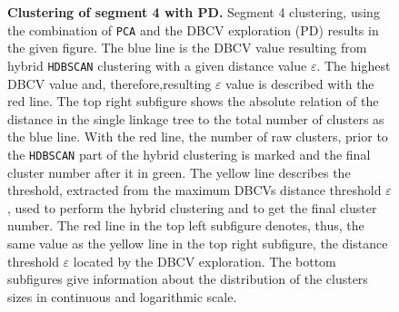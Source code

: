 \begin{figure}[!htb]
\begin{subfigure}[b]{0.475\textwidth}
    \end{subfigure}
    \caption[Clustering of segment 4 with PD]{\textbf{Clustering of segment 4 with PD.} Segment 4 clustering, using the combination of \texttt{PCA} and the \gls{DBCV} exploration (PD) results in the given figure. The blue line is the \gls{DBCV} value resulting from hybrid \texttt{HDBSCAN} clustering with a given distance value $\varepsilon$. The highest \gls{DBCV} value and, therefore,resulting $\varepsilon$ value is described with the red line. The top right subfigure shows the absolute relation of the distance in the single linkage tree to the total number of clusters as the blue line. With the red line, the number of raw clusters, prior to the \texttt{HDBSCAN} part of the hybrid clustering is marked and the final cluster number after it in green. The yellow line describes the threshold, extracted from the maximum \glspl{DBCV} distance threshold $\varepsilon$, used to perform the hybrid clustering and to get the final cluster number. The red line in the top left subfigure denotes, thus, the same value as the yellow line in the top right subfigure, the distance threshold $\varepsilon$ located by the \gls{DBCV} exploration. The bottom subfigures give information about the distribution of the clusters sizes in continuous and logarithmic scale.}
    \label{fig:PCA_Cluster_DBCV_4}
\end{figure}

\FloatBarrier
\newpage


